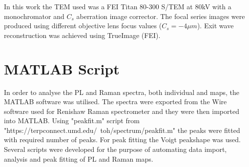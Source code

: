 In this work the TEM used was a FEI Titan 80-300 S/TEM at 80kV with a monochromator and $C_s$ aberration image corrector. The focal series images were produced using different objective lens focus values ($C_s = -4\mu m$). Exit wave reconstruction was achieved using TrueImage (FEI).

\section{MATLAB Script}

In order to analyse the PL and Raman spectra, both individual and maps, the MATLAB software was utilised. The spectra were exported from the Wire software used for Renishaw Raman spectrometer and they were then imported into MATLAB. Using "peakfit.m" script from "https://terpconnect.umd.edu/~toh/spectrum/peakfit.m" the peaks were fitted with required number of peaks. For peak fitting the Voigt peakshape was used. Several scripts were developed for the purpose of automating data import, analysis and peak fitting of PL and Raman maps.